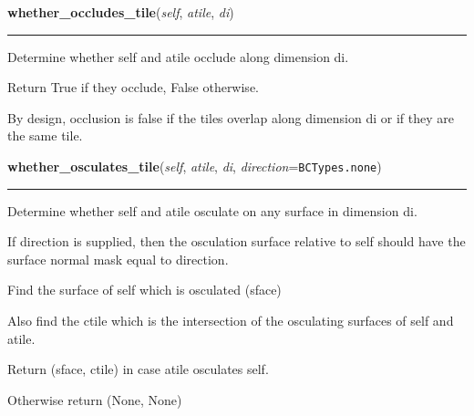 \hspace{.8\funcindent}\begin{boxedminipage}{\funcwidth}

    \raggedright \textbf{whether\_occludes\_tile}(\textit{self}, \textit{atile}, \textit{di})

    \vspace{-1.5ex}

    \rule{\textwidth}{0.5\fboxrule}
\setlength{\parskip}{2ex}
    Determine whether self and atile occlude along dimension di.

    Return True if they occlude, False otherwise.

    By design, occlusion is false if the tiles overlap along dimension di 
    or if they are the same tile.

\setlength{\parskip}{1ex}
    \end{boxedminipage}

    \label{Tiling:Tile:whether_osculates_tile}

    \vspace{0.5ex}

\hspace{.8\funcindent}\begin{boxedminipage}{\funcwidth}

    \raggedright \textbf{whether\_osculates\_tile}(\textit{self}, \textit{atile}, \textit{di}, \textit{direction}={\tt BCTypes.none})

    \vspace{-1.5ex}

    \rule{\textwidth}{0.5\fboxrule}
\setlength{\parskip}{2ex}
    Determine whether self and atile osculate on any surface in dimension 
    di.

    If direction is supplied, then the osculation surface relative to self 
    should have the surface normal mask equal to direction.

    Find the surface of self which is osculated (sface)

    Also find the ctile which is the intersection of the osculating 
    surfaces of self and atile.

    Return (sface, ctile) in case atile osculates self.

    Otherwise return (None, None)

\setlength{\parskip}{1ex}
    \end{boxedminipage}

